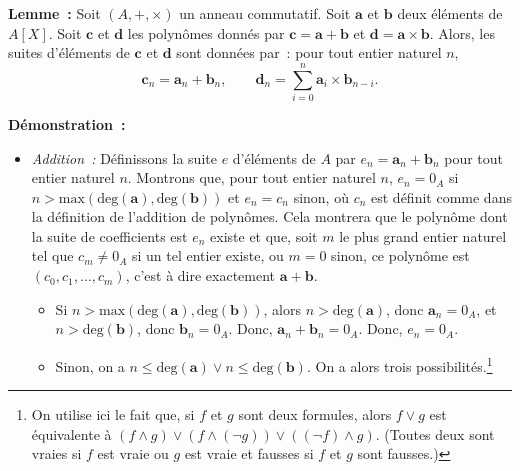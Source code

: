 \medskip

\noindent\textbf{Lemme :}
    Soit $(A, +, \times)$ un anneau commutatif.
    Soit $\mathbf{a}$ et $\mathbf{b}$ deux éléments de $A[X]$. 
    Soit $\mathbf{c}$ et $\mathbf{d}$ les polynômes donnés par $\mathbf{c} = \mathbf{a} + \mathbf{b}$ et $\mathbf{d} = \mathbf{a} \times \mathbf{b}$.
    Alors, les suites d'éléments de $\mathbf{c}$ et $\mathbf{d}$ sont données par : pour tout entier naturel $n$, 
    \begin{equation*}
        \mathbf{c}_n = \mathbf{a}_n + \mathbf{b}_n, 
        \qquad
        \mathbf{d}_n = \sum_{i=0}^n \mathbf{a}_i \times \mathbf{b}_{n-i}
        .
    \end{equation*}

\medskip

\noindent\textbf{Démonstration :} 
\begin{itemize}[nosep]
    \item \textit{Addition :} 
        Définissons la suite $e$ d'éléments de $A$ par $e_n = \mathbf{a}_n + \mathbf{b}_n$ pour tout entier naturel $n$.
        Montrons que, pour tout entier naturel $n$, $e_n = 0_A$ si $n > \mathrm{max}(\mathrm{deg}(\mathbf{a}), \mathrm{deg}(\mathbf{b}))$ et $e_n = c_n$ sinon, où $c_n$ est définit comme dans la définition de l'addition de polynômes. 
        Cela montrera que le polynôme dont la suite de coefficients est $e_n$ existe et que, soit $m$ le plus grand entier naturel tel que $c_m \neq 0_A$ si un tel entier existe, ou $m = 0$ sinon, ce polynôme est $(c_0, c_1, \dots, c_m)$, c'est à dire exactement $\mathbf{a} + \mathbf{b}$.
        \begin{itemize}[nosep]
            \item Si $n > \mathrm{max}(\mathrm{deg}(\mathbf{a}), \mathrm{deg}(\mathbf{b}))$, alors $n > \mathrm{deg}(\mathbf{a})$, donc $\mathbf{a}_n = 0_A$, et $n > \mathrm{deg}(\mathbf{b})$, donc $\mathbf{b}_n = 0_A$.
                Donc, $\mathbf{a}_n + \mathbf{b}_n = 0_A$.
                Donc, $e_n = 0_A$.
            \item Sinon, on a $n \leq \mathrm{deg}(\mathbf{a}) \vee n \leq \mathrm{deg}(\mathbf{b})$. 
                On a alors trois possibilités.\footnote{
                    On utilise ici le fait que, si $f$ et $g$ sont deux formules, alors $f \vee g$ est équivalente à $(f \wedge g) \vee (f \wedge (\neg g)) \vee ((\neg f) \wedge g)$.
                    (Toutes deux sont vraies si $f$ est vraie ou $g$ est vraie et fausses si $f$ et $g$ sont fausses.)
                }
                \begin{itemize}[nosep]

\end{itemize}
\end{itemize}
\end{itemize}
